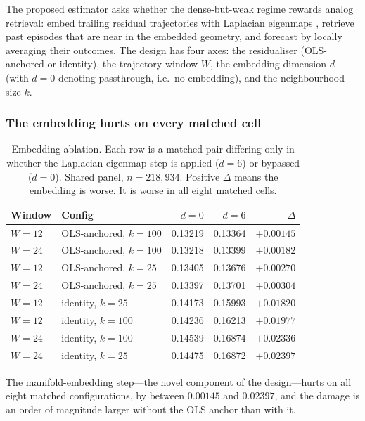 The proposed estimator asks whether the dense-but-weak regime rewards analog
retrieval: embed trailing residual trajectories with Laplacian eigenmaps
\citep{BelkinNiyogi2003}, retrieve past episodes that are near in the embedded
geometry, and forecast by locally averaging their outcomes. The design has four
axes: the residualiser (OLS-anchored or identity), the trajectory window $W$,
the embedding dimension $d$ (with $d = 0$ denoting passthrough, i.e.\ no
embedding), and the neighbourhood size $k$.

\subsubsection{The embedding hurts on every matched cell}

\begin{table}[H]
\centering
\caption{Embedding ablation. Each row is a matched pair differing only in
whether the Laplacian-eigenmap step is applied ($d = 6$) or bypassed
($d = 0$). Shared panel, $n = 218{,}934$. Positive $\Delta$ means the embedding
is worse. It is worse in all eight matched cells.}
\label{tab:knn_ablation}
\begin{tabular}{llrrr}
\toprule
Window & Config & $d = 0$ & $d = 6$ & $\Delta$ \\
\midrule
$W = 12$ & OLS-anchored, $k = 100$ & 0.13219 & 0.13364 & $+0.00145$ \\
$W = 24$ & OLS-anchored, $k = 100$ & 0.13218 & 0.13399 & $+0.00182$ \\
$W = 12$ & OLS-anchored, $k = 25$  & 0.13405 & 0.13676 & $+0.00270$ \\
$W = 24$ & OLS-anchored, $k = 25$  & 0.13397 & 0.13701 & $+0.00304$ \\
$W = 12$ & identity, $k = 25$      & 0.14173 & 0.15993 & $+0.01820$ \\
$W = 12$ & identity, $k = 100$     & 0.14236 & 0.16213 & $+0.01977$ \\
$W = 24$ & identity, $k = 100$     & 0.14539 & 0.16874 & $+0.02336$ \\
$W = 24$ & identity, $k = 25$      & 0.14475 & 0.16872 & $+0.02397$ \\
\bottomrule
\end{tabular}
\end{table}

The manifold-embedding step---the novel component of the design---hurts on all
eight matched configurations, by between $0.00145$ and $0.02397$, and the
damage is an order of magnitude larger without the OLS anchor than with it.


